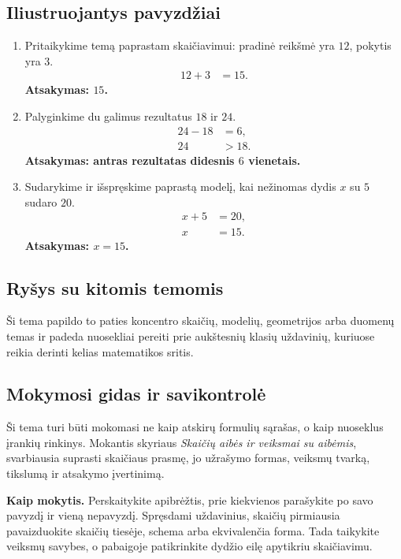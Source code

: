\subsection{Iliustruojantys pavyzdžiai}
\begin{enumerate}[label=\arabic*.]
\item Pritaikykime temą paprastam skaičiavimui: pradinė reikšmė yra \(12\), pokytis yra \(3\).
\begin{align}
12+3&=15.
\end{align}
\textbf{Atsakymas: \(15\).}
\item Palyginkime du galimus rezultatus \(18\) ir \(24\).
\begin{align}
24-18&=6,\\
24&>18.
\end{align}
\textbf{Atsakymas: antras rezultatas didesnis \(6\) vienetais.}
\item Sudarykime ir išspręskime paprastą modelį, kai nežinomas dydis \(x\) su \(5\) sudaro \(20\).
\begin{align}
x+5&=20,\\
x&=15.
\end{align}
\textbf{Atsakymas: \(x=15\).}
\end{enumerate}

\subsection{Ryšys su kitomis temomis}
Ši tema papildo to paties koncentro skaičių, modelių, geometrijos arba duomenų temas ir padeda nuosekliai pereiti prie aukštesnių klasių uždavinių, kuriuose reikia derinti kelias matematikos sritis.

\subsection{Mokymosi gidas ir savikontrolė}

Ši tema turi būti mokomasi ne kaip atskirų formulių sąrašas, o kaip nuoseklus įrankių rinkinys. Mokantis skyriaus \textit{Skaičių aibės ir veiksmai su aibėmis}, svarbiausia suprasti skaičiaus prasmę, jo užrašymo formas, veiksmų tvarką, tikslumą ir atsakymo įvertinimą.

\textbf{Kaip mokytis.} Perskaitykite apibrėžtis, prie kiekvienos parašykite po savo pavyzdį ir vieną nepavyzdį. Spręsdami uždavinius, skaičių pirmiausia pavaizduokite skaičių tiesėje, schema arba ekvivalenčia forma. Tada taikykite veiksmų savybes, o pabaigoje patikrinkite dydžio eilę apytikriu skaičiavimu.


